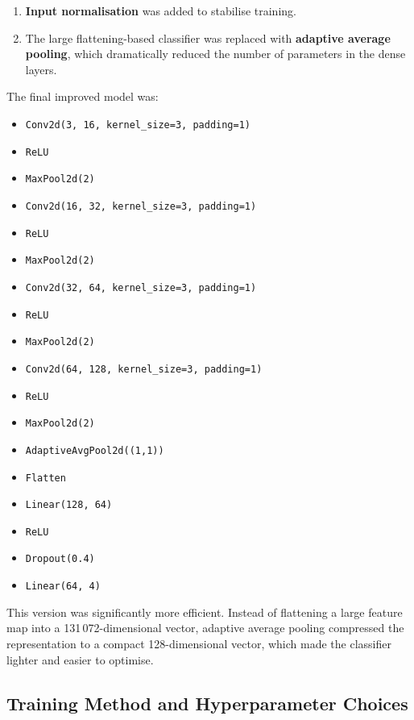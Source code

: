 \documentclass{article}
\begin{document}
\begin{enumerate}
    \item \textbf{Input normalisation} was added to stabilise training.
    \item The large flattening-based classifier was replaced with \textbf{adaptive average pooling}, which dramatically reduced the number of parameters in the dense layers.
\end{enumerate}

The final improved model was:

\begin{itemize}
    \item \texttt{Conv2d(3, 16, kernel\_size=3, padding=1)}
    \item \texttt{ReLU}
    \item \texttt{MaxPool2d(2)}
    \item \texttt{Conv2d(16, 32, kernel\_size=3, padding=1)}
    \item \texttt{ReLU}
    \item \texttt{MaxPool2d(2)}
    \item \texttt{Conv2d(32, 64, kernel\_size=3, padding=1)}
    \item \texttt{ReLU}
    \item \texttt{MaxPool2d(2)}
    \item \texttt{Conv2d(64, 128, kernel\_size=3, padding=1)}
    \item \texttt{ReLU}
    \item \texttt{MaxPool2d(2)}
    \item \texttt{AdaptiveAvgPool2d((1,1))}
    \item \texttt{Flatten}
    \item \texttt{Linear(128, 64)}
    \item \texttt{ReLU}
    \item \texttt{Dropout(0.4)}
    \item \texttt{Linear(64, 4)}
\end{itemize}

This version was significantly more efficient. Instead of flattening a large feature map into a 131\,072-dimensional vector, adaptive average pooling compressed the representation to a compact 128-dimensional vector, which made the classifier lighter and easier to optimise.

\subsection{Training Method and Hyperparameter Choices}
\end{document}
